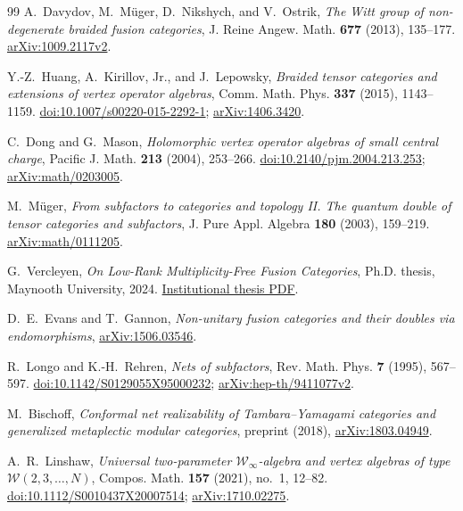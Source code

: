 \begin{thebibliography}{99}
A.~Davydov, M.~M\"uger, D.~Nikshych, and V.~Ostrik,
\emph{The Witt group of non-degenerate braided fusion categories},
J. Reine Angew. Math. \textbf{677} (2013), 135--177.
\href{https://arxiv.org/abs/1009.2117v2}{arXiv:1009.2117v2}.

Y.-Z.~Huang, A.~Kirillov, Jr., and J.~Lepowsky,
\emph{Braided tensor categories and extensions of vertex operator algebras},
Comm. Math. Phys. \textbf{337} (2015), 1143--1159.
\href{https://doi.org/10.1007/s00220-015-2292-1}{doi:10.1007/s00220-015-2292-1};
\href{https://arxiv.org/abs/1406.3420}{arXiv:1406.3420}.

C.~Dong and G.~Mason,
\emph{Holomorphic vertex operator algebras of small central charge},
Pacific J. Math. \textbf{213} (2004), 253--266.
\href{https://doi.org/10.2140/pjm.2004.213.253}{doi:10.2140/pjm.2004.213.253};
\href{https://arxiv.org/abs/math/0203005}{arXiv:math/0203005}.

M.~M\"uger,
\emph{From subfactors to categories and topology II.
The quantum double of tensor categories and subfactors},
J. Pure Appl. Algebra \textbf{180} (2003), 159--219.
\href{https://arxiv.org/abs/math/0111205}{arXiv:math/0111205}.

G.~Vercleyen,
\emph{On Low-Rank Multiplicity-Free Fusion Categories},
Ph.D. thesis, Maynooth University, 2024.
\href{https://mural.maynoothuniversity.ie/id/eprint/18958/1/phd.pdf}{Institutional thesis PDF}.

D.~E.~Evans and T.~Gannon,
\emph{Non-unitary fusion categories and their doubles via endomorphisms},
\href{https://arxiv.org/abs/1506.03546}{arXiv:1506.03546}.

R.~Longo and K.-H.~Rehren,
\emph{Nets of subfactors},
Rev. Math. Phys. \textbf{7} (1995), 567--597.
\href{https://doi.org/10.1142/S0129055X95000232}{doi:10.1142/S0129055X95000232};
\href{https://arxiv.org/abs/hep-th/9411077v2}{arXiv:hep-th/9411077v2}.

M.~Bischoff,
\emph{Conformal net realizability of Tambara--Yamagami categories
and generalized metaplectic modular categories},
preprint (2018),
\href{https://arxiv.org/abs/1803.04949}{arXiv:1803.04949}.

A.~R.~Linshaw,
\emph{Universal two-parameter $\mathcal W_\infty$-algebra and vertex
algebras of type $\mathcal W(2,3,\ldots,N)$},
Compos. Math. \textbf{157} (2021), no.~1, 12--82.
\href{https://doi.org/10.1112/S0010437X20007514}{doi:10.1112/S0010437X20007514};
\href{https://arxiv.org/abs/1710.02275}{arXiv:1710.02275}.


\end{thebibliography}
